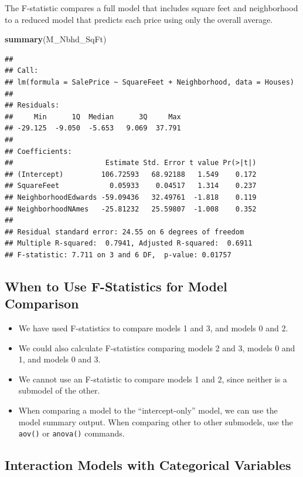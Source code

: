 \documentclass[]{book}
\newenvironment{Shaded}{\begin{snugshade}}{\end{snugshade}}
\newcommand{\KeywordTok}[1]{\textcolor[rgb]{0.13,0.29,0.53}{\textbf{#1}}}
\newcommand{\NormalTok}[1]{#1}
\providecommand{\tightlist}{%
  \setlength{\itemsep}{0pt}\setlength{\parskip}{0pt}}
\begin{document}
The F-statistic compares a full model that includes square feet and
neighborhood to a reduced model that predicts each price using only the
overall average.

\begin{Shaded}
\begin{Highlighting}[]
\KeywordTok{summary}\NormalTok{(M_Nbhd_SqFt)}
\end{Highlighting}
\end{Shaded}

\begin{verbatim}
## 
## Call:
## lm(formula = SalePrice ~ SquareFeet + Neighborhood, data = Houses)
## 
## Residuals:
##     Min      1Q  Median      3Q     Max 
## -29.125  -9.050  -5.653   9.069  37.791 
## 
## Coefficients:
##                      Estimate Std. Error t value Pr(>|t|)
## (Intercept)         106.72593   68.92188   1.549    0.172
## SquareFeet            0.05933    0.04517   1.314    0.237
## NeighborhoodEdwards -59.09436   32.49761  -1.818    0.119
## NeighborhoodNAmes   -25.81232   25.59807  -1.008    0.352
## 
## Residual standard error: 24.55 on 6 degrees of freedom
## Multiple R-squared:  0.7941, Adjusted R-squared:  0.6911 
## F-statistic: 7.711 on 3 and 6 DF,  p-value: 0.01757
\end{verbatim}

\subsection{When to Use F-Statistics for Model
Comparison}\label{when-to-use-f-statistics-for-model-comparison}

\begin{itemize}
\tightlist
\item
  We have used F-statistics to compare models 1 and 3, and models 0 and
  2.
\item
  We could also calculate F-statistics comparing models 2 and 3, models
  0 and 1, and models 0 and 3.\\
\item
  We cannot use an F-statistic to compare models 1 and 2, since neither
  is a submodel of the other.\\
\item
  When comparing a model to the ``intercept-only'' model, we can use the
  model summary output. When comparing other to other submodels, use the
  \texttt{aov()} or \texttt{anova()} commands.
\end{itemize}

\subsection{Interaction Models with Categorical
Variables}\label{interaction-models-with-categorical-variables}
\end{document}
